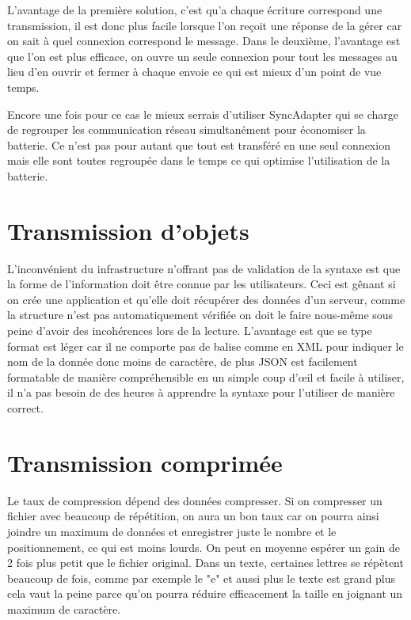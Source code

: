 \documentclass[10pt,a4paper]{article}
\begin{document}
L'avantage de la première solution, c'est qu'a chaque écriture correspond une transmission, il est donc plus facile lorsque l'on reçoit une réponse de la gérer car on sait à quel connexion correspond le message. Dans le deuxième, l'avantage est que l'on est plus efficace, on ouvre un seule connexion pour tout les messages au lieu d'en ouvrir et fermer à chaque envoie ce qui est mieux d'un point de vue temps. 

Encore une fois pour ce cas le mieux serrais d'utiliser SyncAdapter qui se charge de regrouper les communication réseau simultanément pour économiser la batterie. Ce n'est pas pour autant que tout est transféré en une seul connexion mais elle sont toutes regroupée dans le temps ce qui optimise l'utilisation de la batterie.

\section{Transmission d'objets}
L'inconvénient du infrastructure n'offrant pas de validation de la syntaxe est que la forme de l'information doit être connue par les utilisateurs. 
Ceci est gênant si on crée une application et qu'elle doit récupérer des données d'un serveur, comme la structure n'est pas automatiquement vérifiée on doit le faire nous-même sous peine d'avoir des incohérences lors de la lecture.
L'avantage est que se type format est léger car il  ne comporte pas de balise comme en XML pour indiquer le nom de la donnée donc moins de caractère, de plus JSON est facilement formatable de manière compréhensible en un simple coup d'œil et facile à utiliser, il n'a pas besoin de des heures à apprendre la syntaxe pour l'utiliser de manière correct.


\section{Transmission comprimée}
Le taux de compression dépend des données compresser. 
Si on compresser un fichier avec beaucoup de répétition, on aura un bon taux car on pourra ainsi joindre un maximum de données et enregistrer juste le nombre et le positionnement, ce qui est moins lourds. 
On peut en moyenne espérer un gain de 2 fois plus petit que le fichier original. Dans un texte, certaines lettres se répètent beaucoup de fois, comme par exemple le "e" et aussi plus le texte est grand plus cela vaut la peine parce qu'on pourra réduire efficacement la taille en joignant un maximum de caractère. 
\end{document}
